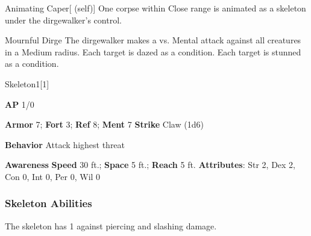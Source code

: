 \begin{attuneability}{Animating Caper}[ (self)]
One corpse within Close range is animated as a skeleton under the dirgewalker's control.
\end{attuneability}

\vspace{0.5em}
\begin{freeability}{Mournful Dirge}
The dirgewalker makes a  vs. Mental attack against all creatures in a Medium radius.
\hit Each target is dazed as a condition.
\crit Each target is stunned as a condition.
\end{freeability}

\begin{monsection}{Skeleton}{1}[1]
\vspace{-1em}\vspace{-1em}
\begin{spellcontent}
\begin{spelltargetinginfo}
{\textbf{AP} 1/0}

\pari \textbf{Armor} 7;
\textbf{Fort} 3;
\textbf{Ref} 8;
\textbf{Ment} 7
\pari \textbf{Strike} Claw  (1d6)



\pari \textbf{Behavior} Attack highest threat
\end{spelltargetinginfo}
\end{spellcontent}

\begin{monsterfooter}
\pari \textbf{Awareness} 
\pari \textbf{Speed} 30 ft.;
\textbf{Space} 5 ft.;
\textbf{Reach} 5 ft.
\pari \textbf{Attributes}:
Str 2,
Dex 2,
Con 0,
Int 0,
Per 0,
Wil 0
\end{monsterfooter}
\end{monsection}


\subsubsection{Skeleton Abilities}

The skeleton has  1 against piercing and slashing damage.

